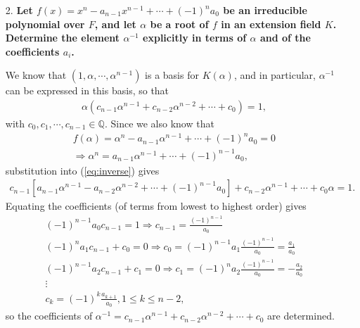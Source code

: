 \documentclass[a4paper,12pt]{article}
\begin{document}
\begin{enumerate}
    \item[2.]
        \boldmath
        \textbf{Let $f(x) = x^n - a_{n - 1}x^{n - 1} + \cdots + (-1)^n a_0$ be an irreducible polynomial over $F$, and let $\alpha$ be a root of $f$ in an extension field $K$. Determine the element $\alpha^{-1}$ explicitly in terms of $\alpha$ and of the coefficients $a_i$.} \par
        \unboldmath
        We know that $(1, \alpha, \cdots, \alpha^{n - 1})$ is a basis for $K(\alpha)$, and in particular, $\alpha^{-1}$ can be expressed in this basis, so that
        \begin{align} \label{eq:inverse}
            \alpha(c_{n - 1}\alpha^{n - 1} + c_{n - 2}\alpha^{n - 2} + \cdots + c_0) = 1,
        \end{align}
        with $c_0, c_1, \cdots, c_{n - 1} \in \mathbb{Q}$. Since we also know that
        \begin{gather*}
            f(\alpha) = \alpha^n - a_{n - 1}\alpha^{n - 1} + \cdots + (-1)^n a_0 = 0 \\
            \Rightarrow \alpha^n = a_{n - 1}\alpha^{n - 1} + \cdots + (-1)^{n - 1} a_0,
        \end{gather*}
        substitution into (\ref{eq:inverse}) gives
        \begin{align*}
            c_{n - 1}[a_{n - 1}\alpha^{n - 1} - a_{n - 2}\alpha^{n - 2} + \cdots + (-1)^{n - 1}a_0] + c_{n - 2}\alpha^{n - 1} + \cdots + c_0 \alpha = 1.
        \end{align*}
        Equating the coefficients (of terms from lowest to highest order) gives
        \begin{gather*}
            (-1)^{n - 1} a_0 c_{n - 1} = 1 \Rightarrow c_{n - 1} = \frac{(-1)^{n - 1}}{a_0} \\
            (-1)^n a_1 c_{n - 1} + c_0 = 0 \Rightarrow c_0 = (-1)^{n - 1} a_1 \frac{(-1)^{n - 1}}{a_0} = \frac{a_1}{a_0} \\
            (-1)^{n - 1} a_2 c_{n - 1} + c_1 = 0 \Rightarrow c_1 = (-1)^n a_2 \frac{(-1)^{n - 1}}{a_0} = -\frac{a_2}{a_0} \\
            \vdots \\
            c_k = (-1)^k \frac{a_{k + 1}}{a_0}, 1 \leq k \leq n - 2,
        \end{gather*}
        so the coefficients of $\alpha^{-1} = c_{n - 1} \alpha^{n - 1} + c_{n - 2} \alpha^{n - 2} + \cdots + c_0$ are determined.

\end{enumerate}
\end{document}
